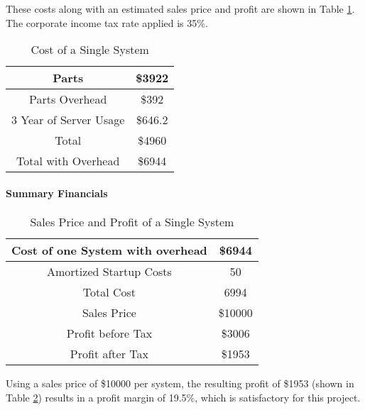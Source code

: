 \documentclass[PPFS.tex]{template/subfiles}
\begin{document}
        These costs along with an estimated sales price and profit are shown in Table \ref{tab:prodTotalCosts}. The corporate income tax rate applied is 35\%.
        
        \begin{table}[H]
        	\begin{center}
        		\caption{Cost of a Single System}
        		\label{tab:prodTotalCosts}
        		\begin{tabular}{|c|c|}
        			\hline
        			Parts & \$3922\\
        			\hline
        			Parts Overhead & \$392\\
        			\hline
        			3 Year of Server Usage & \$646.2\\
        			\hline
        			Total & \$4960\\
        			\hline
        			Total with Overhead & \$6944\\
        			\hline
        		\end{tabular}
        	\end{center}
        \end{table}
        
        \paragraph{Summary Financials}
        
		\begin{table}[H]
			\begin{center}
				\caption{Sales Price and Profit of a Single System}
				\label{tab:SalesPrice}
				\begin{tabular}{|c|c|}
					\hline
					Cost of one System with overhead & \$6944\\
					\hline
					Amortized Startup Costs & 50\\
					\hline
					Total Cost & 6994\\
					\hline
					Sales Price & \$10000\\
					\hline
					Profit before Tax& \$3006\\
					\hline
					Profit after Tax& \$1953\\
					\hline
				\end{tabular}
			\end{center}
		\end{table}
        
        Using a sales price of \$10000 per system, the resulting profit of \$1953 (shown in Table \ref{tab:SalesPrice}) results in a profit margin of 19.5\%, which is satisfactory for this project.
        
        
\end{document}
